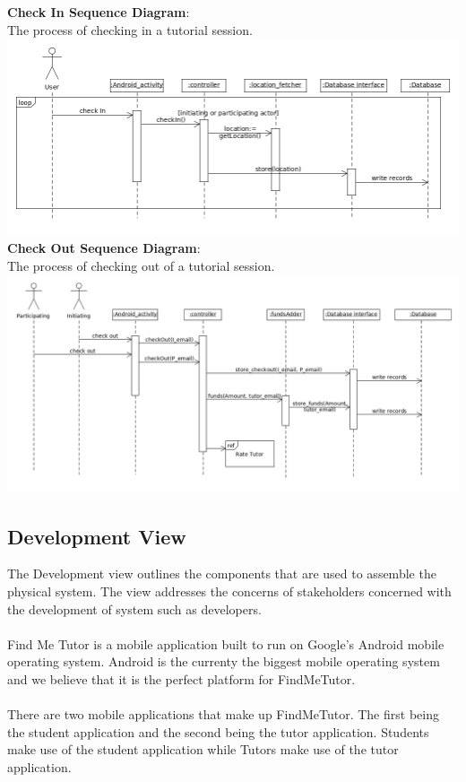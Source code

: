\documentclass[12pt]{article}
\begin{document}
\newpage
\textbf{Check In Sequence Diagram}:\\
The process of checking in a tutorial session.\\
\includegraphics[width=140mm]{./sequence_diagram/check_in.png}
\newpage
\textbf{Check Out Sequence Diagram}:\\
The process of checking out of a tutorial session.\\
\includegraphics[width=140mm]{./sequence_diagram/check_out.png}
\newpage

\subsection{Development View}
The Development view outlines the components that are used to assemble the physical system.
The view addresses the concerns of stakeholders concerned with the development of system such as developers.\\
\\
Find Me Tutor is a mobile application built to run on Google's Android mobile operating system. Android is the currenty the biggest mobile operating system and we believe that it is the perfect platform for FindMeTutor.\\\\
There are two mobile applications that make up FindMeTutor. The first being the student application and the second being the tutor application. Students make use of the student application while Tutors make use of the tutor application.\\
\end{document}
